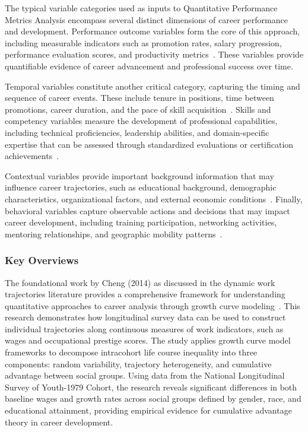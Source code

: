 \documentclass[main.tex]{subfiles}
\begin{document}
The typical variable categories used as inputs to Quantitative Performance Metrics Analysis encompass several distinct dimensions of career performance and development. Performance outcome variables form the core of this approach, including measurable indicators such as promotion rates, salary progression, performance evaluation scores, and productivity metrics~\parencite{performance_iot,beyond_numbers}. These variables provide quantifiable evidence of career advancement and professional success over time.

Temporal variables constitute another critical category, capturing the timing and sequence of career events. These include tenure in positions, time between promotions, career duration, and the pace of skill acquisition~\parencite{scientists_trajectories,career_patterns_europe}. Skills and competency variables measure the development of professional capabilities, including technical proficiencies, leadership abilities, and domain-specific expertise that can be assessed through standardized evaluations or certification achievements~\parencite{longitudinal_psico,quant_analyst_selby}.

Contextual variables provide important background information that may influence career trajectories, such as educational background, demographic characteristics, organizational factors, and external economic conditions~\parencite{scientists_trajectories,work_trajectories}. Finally, behavioral variables capture observable actions and decisions that may impact career development, including training participation, networking activities, mentoring relationships, and geographic mobility patterns~\parencite{career_patterns_europe,job_satisfaction}.

\subsubsection{Key Overviews}

The foundational work by Cheng (2014) as discussed in the dynamic work trajectories literature provides a comprehensive framework for understanding quantitative approaches to career analysis through growth curve modeling~\parencite{work_trajectories}. This research demonstrates how longitudinal survey data can be used to construct individual trajectories along continuous measures of work indicators, such as wages and occupational prestige scores. The study applies growth curve model frameworks to decompose intracohort life course inequality into three components: random variability, trajectory heterogeneity, and cumulative advantage between social groups. Using data from the National Longitudinal Survey of Youth-1979 Cohort, the research reveals significant differences in both baseline wages and growth rates across social groups defined by gender, race, and educational attainment, providing empirical evidence for cumulative advantage theory in career development.
\end{document}
